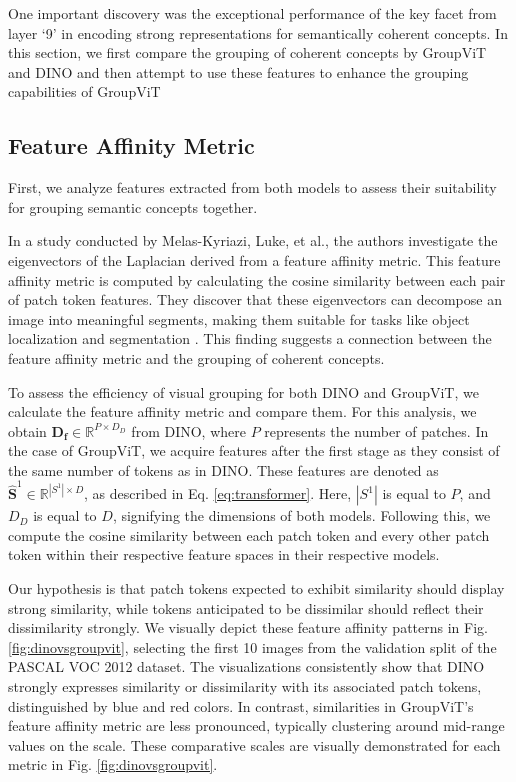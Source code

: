 One important discovery was the exceptional performance of the key facet from layer `9' in encoding strong representations for semantically coherent concepts. In this section, we first compare the grouping of coherent concepts by GroupViT and DINO and then attempt to use these features to enhance the grouping capabilities of GroupViT


\subsection{Feature Affinity Metric}
First, we analyze features extracted from both models to assess their suitability for grouping semantic concepts together.

In a study conducted by Melas-Kyriazi, Luke, et al., the authors investigate the eigenvectors of the Laplacian derived from a feature affinity metric. This feature affinity metric is computed by calculating the cosine similarity between each pair of patch token features. They discover that these eigenvectors can decompose an image into meaningful segments, making them suitable for tasks like object localization and segmentation \cite{melas2022deep}. This finding suggests a connection between the feature affinity metric and the grouping of coherent concepts.

To assess the efficiency of visual grouping for both DINO and GroupViT, we calculate the feature affinity metric and compare them. For this analysis, we obtain $\mathbf{D_f} \in \mathbb{R}^{P \times D_D}$ from DINO, where $P$ represents the number of patches. In the case of GroupViT, we acquire features after the first stage as they consist of the same number of tokens as in DINO. These features are denoted as $\hat{\mathbf{S}}^1 \in \mathbb{R}^{|S^1| \times D}$, as described in Eq. \ref{eq:transformer}. Here, $|S^1|$ is equal to $P$, and $D_D$ is equal to $D$, signifying the dimensions of both models. Following this, we compute the cosine similarity between each patch token and every other patch token within their respective feature spaces in their respective models.

Our hypothesis is that patch tokens expected to exhibit similarity should display strong similarity, while tokens anticipated to be dissimilar should reflect their dissimilarity strongly. We visually depict these feature affinity patterns in Fig. \ref{fig:dinovsgroupvit}, selecting the first 10 images from the validation split of the PASCAL VOC 2012 dataset. The visualizations consistently show that DINO strongly expresses similarity or dissimilarity with its associated patch tokens, distinguished by blue and red colors. In contrast, similarities in GroupViT's feature affinity metric are less pronounced, typically clustering around mid-range values on the scale. These comparative scales are visually demonstrated for each metric in Fig. \ref{fig:dinovsgroupvit}.


